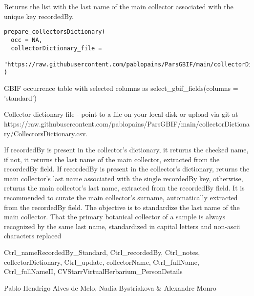 \documentclass[a4paper]{book}
\begin{document}
%
\begin{Description}
Returns the list with the last name of the main collector associated with the unique key recordedBy.
\end{Description}
%
\begin{Usage}
\begin{verbatim}
prepare_collectorsDictionary(
  occ = NA,
  collectorDictionary_file =
    "https://raw.githubusercontent.com/pablopains/ParsGBIF/main/collectorDictionary/CollectorsDictionary.csv"
)
\end{verbatim}
\end{Usage}
%
\begin{Arguments}
\begin{ldescription}
\item[\code{occ}] GBIF occurrence table with selected columns as select\_gbif\_fields(columns = 'standard')

\item[\code{collectorDictionary\_file}] Collector dictionary file - point to a file on your local disk or upload via git at https://raw.githubusercontent.com/pablopains/ParsGBIF/main/collectorDictionary/CollectorsDictionary.csv.
\end{ldescription}
\end{Arguments}
%
\begin{Details}
If recordedBy is present in the collector's dictionary, it returns the checked name, if not, it returns the last name of the main collector, extracted from the recordedBy field.
If recordedBy is present in the collector's dictionary, returns the main collector's last name associated with the single recordedBy key,
otherwise, returns the main collector's last name, extracted from the recordedBy field.
It is recommended to curate the main collector's surname, automatically extracted from the recordedBy field.
The objective is to standardize the last name of the main collector.
That the primary botanical collector of a sample is always recognized by the same last name, standardized in capital letters and non-ascii characters replaced
\end{Details}
%
\begin{Value}
Ctrl\_nameRecordedBy\_Standard,
Ctrl\_recordedBy,
Ctrl\_notes,
collectorDictionary,
Ctrl\_update,
collectorName,
Ctrl\_fullName,
Ctrl\_fullNameII,
CVStarrVirtualHerbarium\_PersonDetails
\end{Value}
%
\begin{Author}
Pablo Hendrigo Alves de Melo,
Nadia Bystriakova \&
Alexandre Monro
\end{Author}
\end{document}
